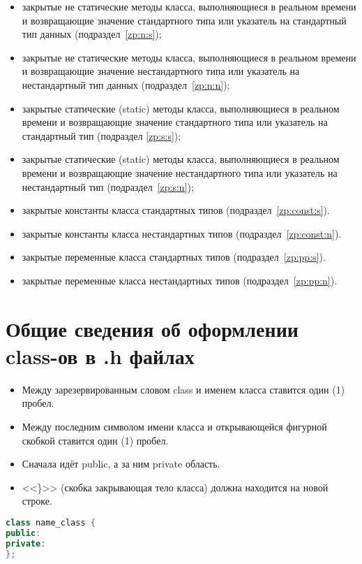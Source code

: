 \begin{enumerate}
\begin{itemize}
		\item закрытые не статические методы класса, выполняющиеся в реальном времени и возвращающие значение стандартного типа или указатель на стандартный тип данных (подраздел~\ref{zp:n:s});
		\item закрытые не статические методы класса, выполняющиеся в реальном времени и возвращающие значение нестандартного типа или указатель на нестандартный тип данных (подраздел~\ref{zp:n:n});
		\item закрытые статические (static) методы класса, выполняющиеся в реальном времени и возвращающие значение стандартного типа или указатель на стандартный тип (подраздел \ref{zp:s:s});
		\item закрытые статические (static) методы класса, выполняющиеся в реальном времени и возвращающие значение нестандартного типа или указатель на нестандартный тип (подраздел~\ref{zp:s:n});
		\item закрытые константы класса стандартных типов (подраздел~\ref{zp:const:s}).
		\item закрытые константы класса нестандартных типов (подраздел~\ref{zp:const:n}).
		\item закрытые переменные класса стандартных типов (подраздел~\ref{zp:pp:s}).
		\item закрытые переменные класса нестандартных типов (подраздел~\ref{zp:pp:n}).
	\end{itemize}
\end{enumerate}

\section{Общие сведения об оформлении class-ов в .h файлах}\label{OBK}
\begin{itemize}
	\item Между зарезервированным словом class и именем класса ставится один (1) пробел.
	\item Между последним символом имени класса и открывающейся фигурной скобкой ставится один (1) пробел.
	\item Сначала идёт public, а за ним private область.
	\item <<\}>> (скобка закрывающая тело класса) должна находится на новой строке.
\end{itemize}\begin{lstlisting}[language=C++, frame=tlBR, basicstyle=\fontsize{10}{10}\ttfamily]
class name_class {
public:
private:
};\end{lstlisting}

